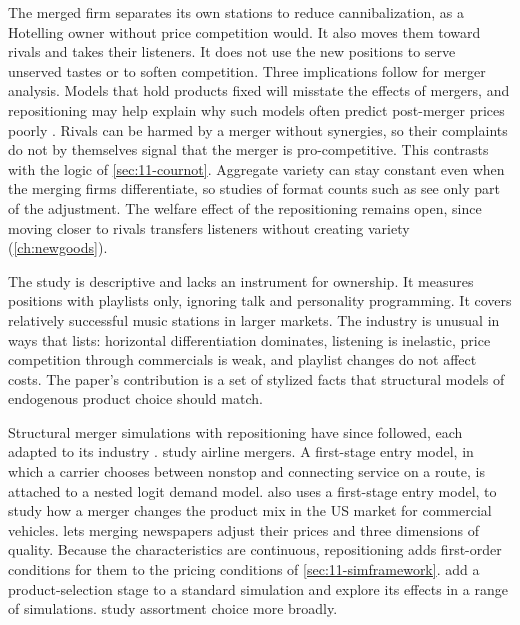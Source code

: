 The merged firm separates its own stations to reduce cannibalization, as a Hotelling owner without price competition
would. It also moves them toward rivals and takes their listeners. It does not use the new positions to serve
unserved tastes or to soften competition. Three implications follow for merger analysis. Models that hold products fixed will misstate the effects
of mergers, and repositioning may help explain why such models often predict post-merger prices poorly
\citep{Peters2006}. Rivals can be harmed by a merger without synergies, so their complaints do not by themselves
signal that the merger is pro-competitive. This contrasts with the logic of \cref{sec:11-cournot}. Aggregate variety
can stay constant even when the merging firms differentiate, so studies of format counts such as
\citet{BerryWaldfogel2001} see only part of the adjustment. The welfare effect of the repositioning remains open,
since moving closer to rivals transfers listeners without creating variety (\cref{ch:newgoods}).

The study is descriptive and lacks an instrument for ownership. It measures positions with playlists only, ignoring
talk and personality programming. It covers relatively successful music stations in larger markets. The industry is
unusual in ways that \citet[pp.~25--26]{Sweeting2010} lists: horizontal differentiation dominates, listening is
inelastic, price competition through commercials is weak, and playlist changes do not affect costs. The paper's
contribution is a set of stylized facts that structural models of endogenous product choice should match.

Structural merger simulations with repositioning have since followed, each adapted to its industry
\citep[pp.~236--237]{AskerNocke2021}. \citet{LiEtAl2019} study airline mergers. A first-stage entry model, in which a
carrier chooses between nonstop and connecting service on a route, is attached to a nested logit demand model.
\citet{Wollmann2018} also uses a first-stage entry model, to study how a merger changes the product mix in the US
market for commercial vehicles. \citet{Fan2013} lets merging newspapers adjust their prices and three dimensions of
quality. Because the characteristics are continuous, repositioning adds first-order conditions for them to the
pricing conditions of \cref{sec:11-simframework}. \citet{MazzeoSeimVarela2018} add a product-selection stage to a
standard simulation and explore its effects in a range of simulations. \citet{DraganskaMazzeoSeim2009} study
assortment choice more broadly.

